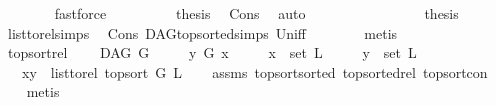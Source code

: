\begin{isabellebody}
\ \ \ \ \ \ \isamarkupfalse%
\ fastforce\ \ \isanewline
\ \ \ \ \isamarkupfalse%
\ \isamarkupfalse%
\ {\isacharquery}{\kern0pt}thesis\ \isamarkupfalse%
\ Cons\ \isamarkupfalse%
\ auto\isanewline
\ \ \isamarkupfalse%
\isanewline
\ \ \ \ \isamarkupfalse%
\ {}\isanewline
\ \ \ \ \isamarkupfalse%
\ \isamarkupfalse%
\ {\isacharquery}{\kern0pt}thesis\ \isamarkupfalse%
\ list{\isacharunderscore}{\kern0pt}to{\isacharunderscore}{\kern0pt}rel{\isachardot}{\kern0pt}simps\ \isamarkupfalse%
\ Cons\ DAG{\isachardot}{\kern0pt}top{\isacharunderscore}{\kern0pt}sorted{\isachardot}{\kern0pt}simps{\isacharparenleft}{\kern0pt}{}{\isacharparenright}{\kern0pt}\ Un{\isacharunderscore}{\kern0pt}iff\isanewline
\ \ \ \ \ \ \isamarkupfalse%
\ metis\ \ \isanewline
\ \ \isamarkupfalse%
\isanewline
{}\isamarkupfalse%
%
\endisatagproof
{\isafoldproof}%
%
\isadelimproof
\isanewline
%
\endisadelimproof
\isanewline
{}\isamarkupfalse%
\ top{\isacharunderscore}{\kern0pt}sort{\isacharunderscore}{\kern0pt}rel{\isacharcolon}{\kern0pt}\ \isanewline
\ \ \ {\isachardoublequoteopen}DAG\ G{\isachardoublequoteclose}\isanewline
\ \ \ \ \ {\isachardoublequoteopen}y\ {\isasymrightarrow}\isactrlsup {\isacharplus}{\kern0pt}\isactrlbsub G\isactrlesub \ x{\isachardoublequoteclose}\isanewline
\ \ \ \ \ {\isachardoublequoteopen}x\ {\isasymin}\ set\ L{\isachardoublequoteclose}\isanewline
\ \ \ \ \ {\isachardoublequoteopen}y\ {\isasymin}\ set\ L{\isachardoublequoteclose}\isanewline
\ \ \ {\isachardoublequoteopen}{\isacharparenleft}{\kern0pt}x{\isacharcomma}{\kern0pt}y{\isacharparenright}{\kern0pt}\ {\isasymin}\ list{\isacharunderscore}{\kern0pt}to{\isacharunderscore}{\kern0pt}rel\ {\isacharparenleft}{\kern0pt}top{\isacharunderscore}{\kern0pt}sort\ G\ L{\isacharparenright}{\kern0pt}{\isachardoublequoteclose}\isanewline
%
\isadelimproof
\ \ %
\endisadelimproof
%
\isatagproof
{}\isamarkupfalse%
\ assms\ top{\isacharunderscore}{\kern0pt}sort{\isacharunderscore}{\kern0pt}sorted\ top{\isacharunderscore}{\kern0pt}sorted{\isacharunderscore}{\kern0pt}rel\ top{\isacharunderscore}{\kern0pt}sort{\isacharunderscore}{\kern0pt}con\isanewline
\ \ \isamarkupfalse%
\ metis%
\endisatagproof
{\isafoldproof}%
%
\isadelimproof
\ \ \isanewline
%
\endisadelimproof

\end{isabellebody}
